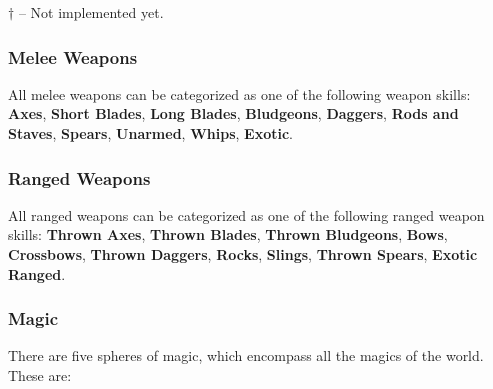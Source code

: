 $\dagger$ -- Not implemented yet.

\subsubsection{Melee Weapons}

All melee weapons can be categorized as one of the following weapon skills: {\bf Axes}, {\bf Short Blades}, {\bf Long Blades}, {\bf Bludgeons}, {\bf Daggers}, {\bf Rods and Staves}, {\bf Spears}, {\bf Unarmed}, {\bf Whips}, {\bf Exotic}.

\subsubsection{Ranged Weapons}

All ranged weapons can be categorized as one of the following ranged weapon skills: {\bf Thrown Axes}, {\bf Thrown Blades}, {\bf Thrown Bludgeons}, {\bf Bows}, {\bf Crossbows}, {\bf Thrown Daggers}, {\bf Rocks}, {\bf Slings}, {\bf Thrown Spears}, {\bf Exotic Ranged}.

\subsubsection{Magic}

There are five spheres of magic, which encompass all the magics of the world.  These are:

